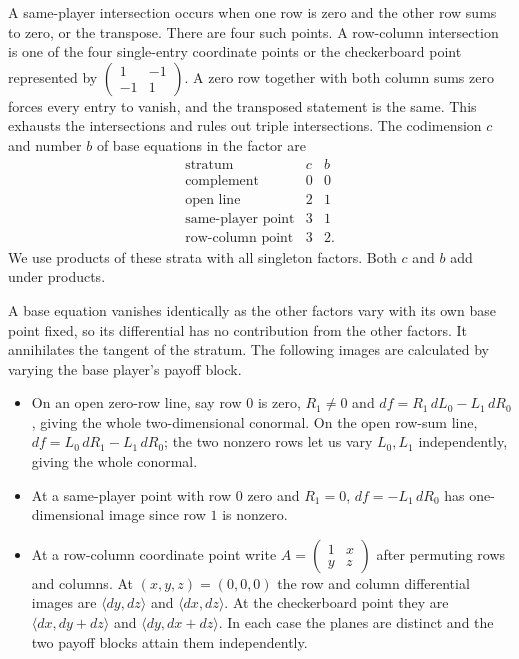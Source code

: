 \documentclass[11pt,a4paper]{amsart}
\begin{document}
A same-player intersection occurs when one row is zero and the other
row sums to zero, or the transpose. There are four such points. A
row-column intersection is one of the four single-entry coordinate
points or the checkerboard point represented by
$\left(\begin{smallmatrix}1&-1\\-1&1\end{smallmatrix}\right)$.
A zero row together with both column sums zero forces every entry to
vanish, and the transposed statement is the same. This exhausts the
intersections and rules out triple intersections. The codimension
$c$ and number $b$ of base equations in the factor are
\[
\begin{array}{c|cc}
\text{stratum} & c & b\\ \hline
\text{complement} & 0&0\\
\text{open line} & 2&1\\
\text{same-player point} & 3&1\\
\text{row-column point} & 3&2.
\end{array}
\]
We use products of these strata with all singleton factors. Both $c$
and $b$ add under products.

A base equation vanishes identically as the other factors vary with
its own base point fixed, so its differential has no contribution
from the other factors. It annihilates the tangent of the stratum.
The following images are calculated by varying the base player's payoff block.

\begin{itemize}
\item On an open zero-row line, say row $0$ is zero, $R_1\ne 0$ and
$df=R_1\,dL_0-L_1\,dR_0$, giving the whole two-dimensional conormal.
On the open row-sum line, $df=L_0\,dR_1-L_1\,dR_0$; the two nonzero
rows let us vary $L_0,L_1$ independently, giving the whole conormal.
\item At a same-player point with row $0$ zero and $R_1=0$,
$df=-L_1\,dR_0$ has one-dimensional image since row $1$ is nonzero.
\item At a row-column coordinate point write
$A=\left(\begin{smallmatrix}1&x\\y&z\end{smallmatrix}\right)$
after permuting rows and columns. At $(x,y,z)=(0,0,0)$ the row and
column differential images are $\langle dy,dz\rangle$ and
$\langle dx,dz\rangle$. At the checkerboard point they are
$\langle dx,dy+dz\rangle$ and $\langle dy,dx+dz\rangle$.
In each case the planes are distinct and the two payoff blocks attain
them independently.
\end{itemize}
\end{document}
